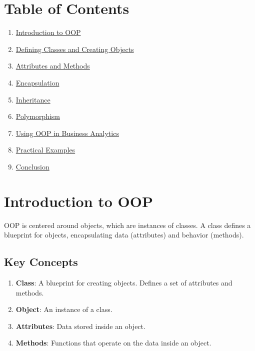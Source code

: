 \documentclass[
  letterpaper,
  DIV=11,
  numbers=noendperiod]{scrreprt}
\providecommand{\tightlist}{%
  \setlength{\itemsep}{0pt}\setlength{\parskip}{0pt}}\usepackage{longtable,booktabs,array}
\begin{document}
\section{Table of Contents}\label{table-of-contents-7}

\begin{enumerate}
\def\labelenumi{\arabic{enumi}.}
\tightlist
\item
  \hyperref[introduction-to-oop]{Introduction to OOP}
\item
  \hyperref[defining-classes-and-creating-objects]{Defining Classes and
  Creating Objects}
\item
  \hyperref[attributes-and-methods]{Attributes and Methods}
\item
  \hyperref[encapsulation]{Encapsulation}
\item
  \hyperref[inheritance]{Inheritance}
\item
  \hyperref[polymorphism]{Polymorphism}
\item
  \hyperref[using-oop-in-business-analytics]{Using OOP in Business
  Analytics}
\item
  \hyperref[practical-examples]{Practical Examples}
\item
  \hyperref[conclusion]{Conclusion}
\end{enumerate}

\section{Introduction to OOP}\label{introduction-to-oop}

OOP is centered around objects, which are instances of classes. A class
defines a blueprint for objects, encapsulating data (attributes) and
behavior (methods).

\subsection{Key Concepts}\label{key-concepts}

\begin{enumerate}
\def\labelenumi{\arabic{enumi}.}
\tightlist
\item
  \textbf{Class}: A blueprint for creating objects. Defines a set of
  attributes and methods.
\item
  \textbf{Object}: An instance of a class.
\item
  \textbf{Attributes}: Data stored inside an object.
\item
  \textbf{Methods}: Functions that operate on the data inside an object.
\end{enumerate}
\end{document}

